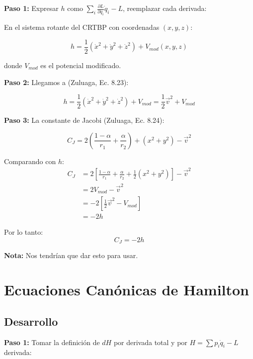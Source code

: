 \documentclass[a4paper]{article}
\begin{document}
\textbf{Paso 1:} Expresar $h$ como $\sum_i \frac{\partial L}{\partial \dot{q}_i}\dot{q}_i - L$, reemplazar cada derivada:

En el sistema rotante del CRTBP con coordenadas $(x, y, z)$:

\begin{equation}
h = \frac{1}{2}(\dot{x}^2 + \dot{y}^2 + \dot{z}^2) + V_{mod}(x,y,z)
\end{equation}

donde $V_{mod}$ es el potencial modificado.

\textbf{Paso 2:} Llegamos a (Zuluaga, Ec. 8.23):

\begin{equation}
h = \frac{1}{2}(\dot{x}^2 + \dot{y}^2 + \dot{z}^2) + V_{mod} = \frac{1}{2}\vec{v}^2 + V_{mod}
\end{equation}

\textbf{Paso 3:} La constante de Jacobi (Zuluaga, Ec. 8.24):

\begin{equation}
C_J = 2\left(\frac{1-\alpha}{r_1} + \frac{\alpha}{r_2}\right) + (x^2 + y^2) - \vec{v}^2
\end{equation}

Comparando con $h$:
\begin{align}
C_J &= 2\left[\frac{1-\alpha}{r_1} + \frac{\alpha}{r_2} + \frac{1}{2}(x^2+y^2)\right] - \vec{v}^2 \\
&= 2V_{mod} - \vec{v}^2 \\
&= -2\left[\frac{1}{2}\vec{v}^2 - V_{mod}\right] \\
&= -2h
\end{align}

Por lo tanto:
\begin{equation}
\boxed{C_J = -2h}
\end{equation}

\textbf{Nota:} Nos tendrían que dar esto para usar.

\section{Ecuaciones Canónicas de Hamilton}

\subsection*{Desarrollo}

\textbf{Paso 1:} Tomar la definición de $dH$ por derivada total y por $H = \sum p_i\dot{q}_i - L$ derivada:
\end{document}
